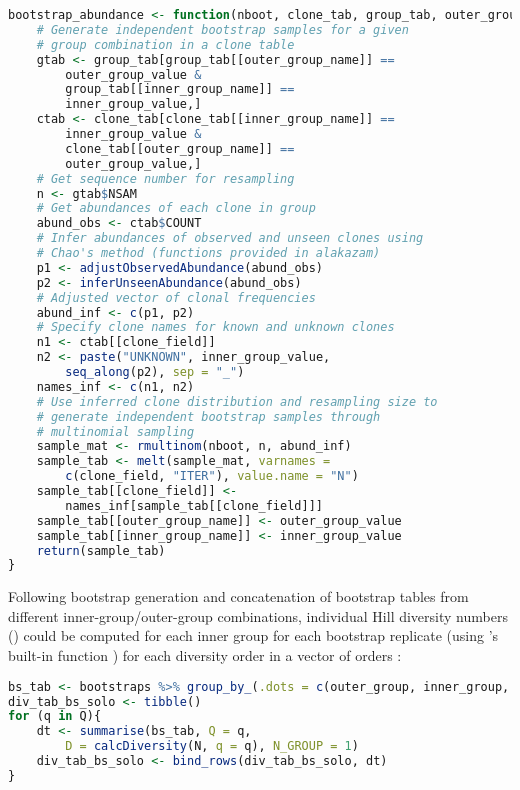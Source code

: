 \begin{lstlisting}[language=R]
bootstrap_abundance <- function(nboot, clone_tab, group_tab, outer_group_name, outer_group_value, inner_group_name, inner_group_value, clone_field){
	# Generate independent bootstrap samples for a given
	# group combination in a clone table
	gtab <- group_tab[group_tab[[outer_group_name]] == 
		outer_group_value & 
		group_tab[[inner_group_name]] == 
		inner_group_value,]
	ctab <- clone_tab[clone_tab[[inner_group_name]] == 
		inner_group_value & 
		clone_tab[[outer_group_name]] == 
		outer_group_value,]
	# Get sequence number for resampling
	n <- gtab$NSAM
	# Get abundances of each clone in group
	abund_obs <- ctab$COUNT
	# Infer abundances of observed and unseen clones using
	# Chao's method (functions provided in alakazam)
	p1 <- adjustObservedAbundance(abund_obs)
	p2 <- inferUnseenAbundance(abund_obs)
	# Adjusted vector of clonal frequencies
	abund_inf <- c(p1, p2)
	# Specify clone names for known and unknown clones
	n1 <- ctab[[clone_field]]
	n2 <- paste("UNKNOWN", inner_group_value,
		seq_along(p2), sep = "_")
	names_inf <- c(n1, n2)
	# Use inferred clone distribution and resampling size to 
	# generate independent bootstrap samples through
	# multinomial sampling
	sample_mat <- rmultinom(nboot, n, abund_inf)
	sample_tab <- melt(sample_mat, varnames = 
		c(clone_field, "ITER"), value.name = "N")
	sample_tab[[clone_field]] <- 
		names_inf[sample_tab[[clone_field]]]
	sample_tab[[outer_group_name]] <- outer_group_value
	sample_tab[[inner_group_name]] <- inner_group_value
	return(sample_tab)
}

\end{lstlisting}

\noindent Following bootstrap generation and concatenation of bootstrap tables from different inner-group/outer-group combinations, individual Hill diversity numbers () could be computed for each inner group for each bootstrap replicate (using 's built-in  function \parencite{gupta2015changeo,stern2014bcells}) for each diversity order in a vector of orders :

\begin{lstlisting}[language=R]
bs_tab <- bootstraps %>% group_by_(.dots = c(outer_group, inner_group, "ITER"))
div_tab_bs_solo <- tibble()
for (q in Q){
	dt <- summarise(bs_tab, Q = q, 
		D = calcDiversity(N, q = q), N_GROUP = 1)
	div_tab_bs_solo <- bind_rows(div_tab_bs_solo, dt)
}
\end{lstlisting}

